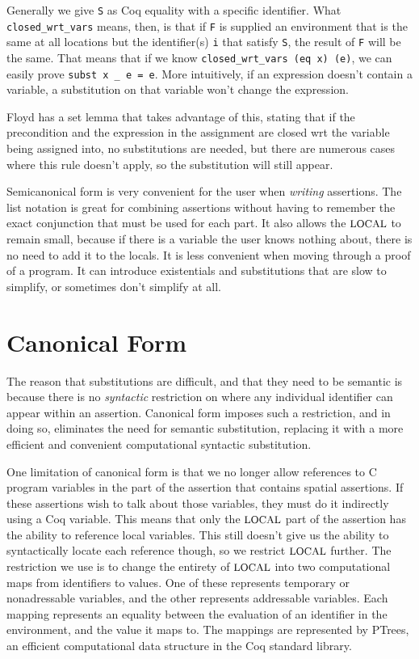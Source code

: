 \documentclass{puthesis}
\begin{document}
Generally we give \lstinline|S| as Coq equality with a specific
identifier.  What \lstinline|closed_wrt_vars| means, then, is that if
\lstinline|F| is supplied an environment that is the same at all
locations but the identifier(s) \lstinline|i| that satisfy
\lstinline|S|, the result of \lstinline|F| will be the same. That
means that if we know \lstinline|closed_wrt_vars (eq x) (e)|, we can
easily prove \lstinline|subst x _ e = e|. More intuitively, if an
expression doesn't contain a variable, a substitution on that variable
won't change the expression.

Floyd has a set lemma that takes advantage of this, stating that if
the precondition and the expression in the assignment are closed wrt
the variable being assigned into, no substitutions are needed, but
there are numerous cases where this rule doesn't apply, so the
substitution will still appear.

Semicanonical form is very convenient for the user when
\emph{writing} assertions. The list notation is great for combining
assertions without having to remember the exact conjunction that must
be used for each part. It also allows the $\mbox{\small LOCAL}$ to remain small,
because if there is a variable the user knows nothing about, there is
no need to add it to the locals. It is less convenient when moving
through a proof of a program. It can introduce existentials and
substitutions that are slow to simplify, or sometimes don't simplify
at all.


\section{Canonical Form}
\label{sec:cform}
The reason that substitutions are difficult, and that they need to be
semantic is because there is no \emph{syntactic} restriction on where
any individual identifier can appear within an assertion.  Canonical
form imposes such a restriction, and in doing so, eliminates the need
for semantic substitution, replacing it with a more efficient and
convenient computational syntactic substitution.

One limitation of canonical form is that we no longer allow references
to C program variables in the part of the assertion that contains
spatial assertions. If these assertions wish to talk about those
variables, they must do it indirectly using a Coq variable.  This
means that only the $\mbox{\small LOCAL}$ part of the assertion has the ability to
reference local variables. This still doesn't give us the ability to
syntactically locate each reference though, so we restrict $\mbox{\small LOCAL}$
further. The restriction we use is to change the entirety of $\mbox{\small LOCAL}$
into two computational maps from identifiers to values.  One of these
represents temporary or nonadressable variables, and the other
represents addressable variables. Each mapping represents an equality
between the evaluation of an identifier in the environment, and the
value it maps to. The mappings are represented by PTrees, an efficient
computational data structure in the Coq standard library.
\end{document}
